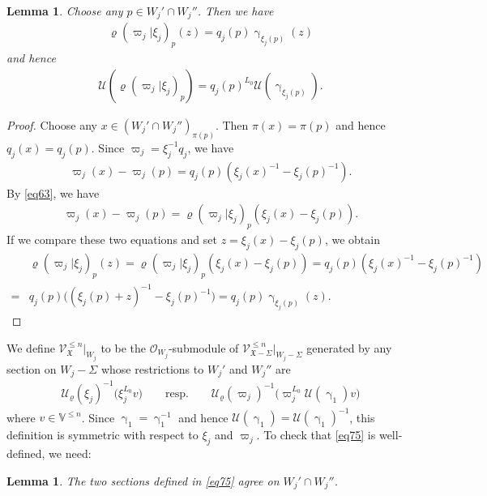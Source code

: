 \documentclass[12pt,a4paper,notitlepage]{report}
\theoremstyle{definition}
\theoremstyle{plain}
\newtheorem{lm}[df]{Lemma}
\newcommand{\fk}{\mathfrak}
\newcommand{\mc}{\mathcal}
\newcommand{\scr}{\mathscr}
\newcommand{\Vbb}{\mathbb V}
\numberwithin{equation}{section}
\begin{document}
\begin{lm}\label{lb123}
Choose any $p\in W_j'\cap W_j''$. Then we have
\begin{gather*}
\varrho(\varpi_j|\xi_j)_p(z)=q_j(p)\upgamma_{\xi_j(p)}(z)
\end{gather*}
and hence
\begin{align*}
\mc U(\varrho(\varpi_j|\xi_j)_p)=q_j(p)^{L_0}\mc U(\upgamma_{\xi_j(p)}).
\end{align*}
\end{lm}
\begin{proof}
Choose any $x\in (W_j'\cap W_j'')_{\pi(p)}$. Then $\pi(x)=\pi(p)$ and hence $q_j(x)=q_j(p)$.  Since $\varpi_j=\xi_j^{-1}q_j$, we have
\begin{align*}
\varpi_j(x)-\varpi_j(p)=q_j(p)(\xi_j(x)^{-1}-\xi_j(p)^{-1}).
\end{align*}
By \eqref{eq63}, we have
\begin{align*}
\varpi_j(x)-\varpi_j(p)=\varrho(\varpi_j|\xi_j)_p(\xi_j(x)-\xi_j(p)).
\end{align*}
If we compare these two equations and set $z=\xi_j(x)-\xi_j(p)$, we obtain
\begin{align*}
&\varrho(\varpi_j|\xi_j)_p(z)=\varrho(\varpi_j|\xi_j)_p(\xi_j(x)-\xi_j(p))=q_j(p)(\xi_j(x)^{-1}-\xi_j(p)^{-1})\\
=&q_j(p)\big((\xi_j(p)+z)^{-1}-\xi_j(p)^{-1} \big)=q_j(p)\upgamma_{\xi_j(p)}(z).
\end{align*}
\end{proof}



We   define $\scr V_{\fk X}^{\leq n}|_{W_j}$ to be the  $\scr O_{W_j}$-submodule of $\scr V_{\fk X-\Sigma}^{\leq n}|_{W_j-\Sigma}$ generated by any section on $W_j-\Sigma$ whose restrictions to $W_j'$ and $W_j''$ are
\begin{align}
\boxed{~~\mc U_\varrho(\xi_j)^{-1}\big(\xi_j^{L_0}v\big)\qquad\text{resp.}\qquad \mc U_\varrho(\varpi_j)^{-1}\big(\varpi_j^{L_0}\mc U(\upgamma_1)v\big)  ~~}\label{eq75}
\end{align}
where $v\in\Vbb^{\leq n}$. Since $\upgamma_1=\upgamma_1^{-1}$ and hence $\mc U(\upgamma_1)=\mc U(\upgamma_1)^{-1}$, this definition is symmetric with respect to $\xi_j$ and $\varpi_j$. To check that \eqref{eq75} is well-defined, we need:

\begin{lm}
The two sections defined in \eqref{eq75} agree on $W_j'\cap W_j''$.
\end{lm}
\end{document}
